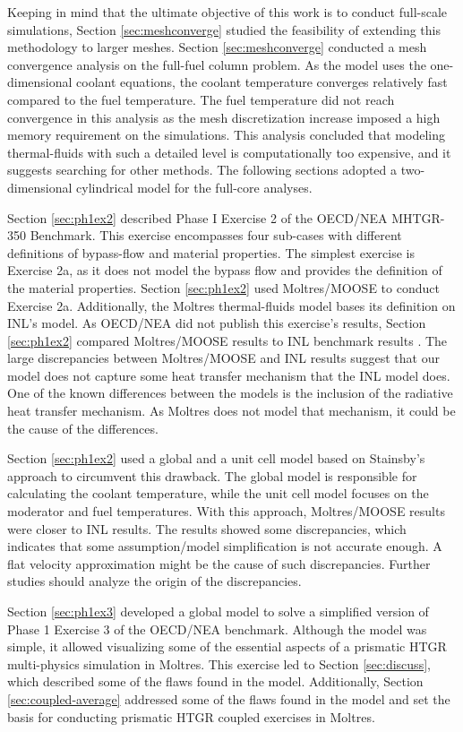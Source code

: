 Keeping in mind that the ultimate objective of this work is to conduct full-scale simulations, Section \ref{sec:meshconverge} studied the feasibility of extending this methodology to larger meshes.
Section \ref{sec:meshconverge} conducted a mesh convergence analysis on the full-fuel column problem.
As the model uses the one-dimensional coolant equations, the coolant temperature converges relatively fast compared to the fuel temperature.
The fuel temperature did not reach convergence in this analysis as the mesh discretization increase imposed a high memory requirement on the simulations.
This analysis concluded that modeling thermal-fluids with such a detailed level is computationally too expensive, and it suggests searching for other methods.
The following sections adopted a two-dimensional cylindrical model for the full-core analyses.

Section \ref{sec:ph1ex2} described Phase I Exercise 2 of the OECD/NEA MHTGR-350 Benchmark.
This exercise encompasses four sub-cases with different definitions of bypass-flow and material properties.
The simplest exercise is Exercise 2a, as it does not model the bypass flow and provides the definition of the material properties.
Section \ref{sec:ph1ex2} used Moltres/MOOSE to conduct Exercise 2a.
Additionally, the Moltres thermal-fluids model bases its definition on INL's model.
As OECD/NEA did not publish this exercise’s results, Section \ref{sec:ph1ex2} compared Moltres/MOOSE results to INL benchmark results \cite{strydom_inl_2013}.
The large discrepancies between Moltres/MOOSE and INL results suggest that our model does not capture some heat transfer mechanism that the INL model does.
One of the known differences between the models is the inclusion of the radiative heat transfer mechanism.
As Moltres does not model that mechanism, it could be the cause of the differences.

Section \ref{sec:ph1ex2} used a global and a unit cell model based on Stainsby's approach \cite{stainsby_investigation_2008} to circumvent this drawback.
The global model is responsible for calculating the coolant temperature, while the unit cell model focuses on the moderator and fuel temperatures.
With this approach, Moltres/MOOSE results were closer to INL results.
The results showed some discrepancies, which indicates that some assumption/model simplification is not accurate enough.
A flat velocity approximation might be the cause of such discrepancies.
Further studies should analyze the origin of the discrepancies.

Section \ref{sec:ph1ex3} developed a global model to solve a simplified version of Phase 1 Exercise 3 of the OECD/NEA benchmark.
Although the model was simple, it allowed visualizing some of the essential aspects of a prismatic HTGR multi-physics simulation in Moltres.
This exercise led to Section \ref{sec:discuss}, which described some of the flaws found in the model.
Additionally, Section \ref{sec:coupled-average} addressed some of the flaws found in the model and set the basis for conducting prismatic HTGR coupled exercises in Moltres.
